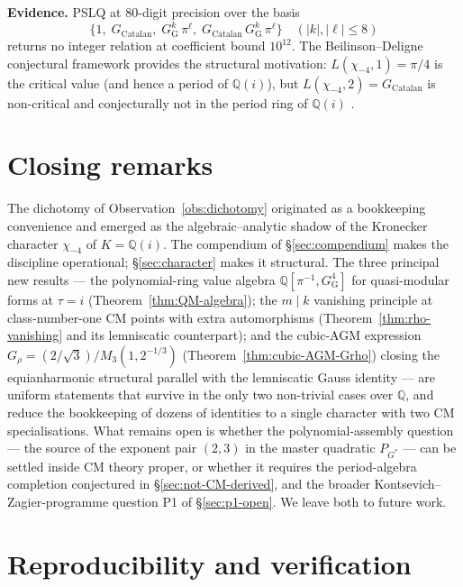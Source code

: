 \documentclass[11pt]{article}
\theoremstyle{definition}
\theoremstyle{remark}
\newcommand{\Gs}{G^{*}}
\newcommand{\GG}{G_{\!\scriptscriptstyle\mathrm{G}}}
\newcommand{\Q}{\mathbb{Q}}
\begin{document}
\noindent\textbf{Evidence.} PSLQ at $80$-digit precision over the basis
\[
\{1,\; G_{\mathrm{Catalan}},\;
\GG^{k}\,\pi^{\ell},\;
G_{\mathrm{Catalan}}\,\GG^{k}\,\pi^{\ell}\}
\quad (|k|, |\ell| \leq 8)
\]
returns no integer relation at coefficient bound $10^{12}$. The
Beilinson--Deligne conjectural framework provides the structural
motivation: $L(\chi_{-4}, 1) = \pi/4$ is the critical value (and hence
a period of $\Q(i)$), but $L(\chi_{-4}, 2) = G_{\mathrm{Catalan}}$ is
non-critical and conjecturally not in the period ring of $\Q(i)$
\cite{beilinson-deligne}.

\section*{Closing remarks}

The dichotomy of Observation~\ref{obs:dichotomy} originated as a
bookkeeping convenience and emerged as the algebraic--analytic shadow
of the Kronecker character $\chi_{-4}$ of $K = \Q(i)$. The compendium
of \S\ref{sec:compendium} makes the discipline operational;
\S\ref{sec:character} makes it structural. The three principal new
results --- the polynomial-ring value algebra
$\Q[\pi^{-1}, \GG^{4}]$ for quasi-modular forms at $\tau = i$
(Theorem~\ref{thm:QM-algebra}); the $m \mid k$ vanishing principle at
class-number-one CM points with extra automorphisms
(Theorem~\ref{thm:rho-vanishing} and its lemniscatic counterpart); and
the cubic-AGM expression $G_\rho = (2/\sqrt 3)/M_3(1, 2^{-1/3})$
(Theorem~\ref{thm:cubic-AGM-Grho}) closing the equianharmonic
structural parallel with the lemniscatic Gauss identity --- are
uniform statements that survive in the only two non-trivial cases over
$\Q$, and reduce the bookkeeping of dozens of identities to a single
character with two CM specialisations. What remains open is whether
the polynomial-assembly question --- the source of the exponent pair
$(2, 3)$ in the master quadratic $P_{\Gs}$ --- can be settled inside
CM theory proper, or whether it requires the period-algebra completion
conjectured in \S\ref{sec:not-CM-derived}, and the broader
Kontsevich--Zagier-programme question P1 of
\S\ref{sec:p1-open}. We leave both to future work.

\section*{Reproducibility and verification}
\end{document}
